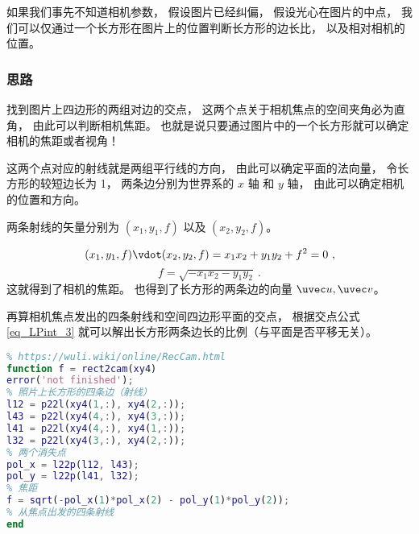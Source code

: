 
\begin{issues}
\issueDraft
\end{issues}


如果我们事先不知道相机参数， 假设图片已经纠偏， 假设光心在图片的中点， 我们可以仅通过一个长方形在图片上的位置判断长方形的边长比， 以及相对相机的位置。

\subsubsection{思路}

找到图片上四边形的两组对边的交点， 这两个点关于相机焦点的空间夹角必为直角， 由此可以判断相机焦距。 也就是说只要通过图片中的一个长方形就可以确定相机的焦距或者视角！

这两个点对应的射线就是两组平行线的方向， 由此可以确定平面的法向量， 令长方形的较短边长为 1， 两条边分别为世界系的 $x$ 轴 和 $y$ 轴， 由此可以确定相机的位置和方向。

两条射线的矢量分别为 $(x_1, y_1, f)$ 以及 $(x_2, y_2, f)$。

\begin{equation}
(x_1, y_1, f)\vdot (x_2, y_2, f) = x_1 x_2 + y_1 y_2 + f^2 = 0~,
\end{equation}
\begin{equation}
f = \sqrt{-x_1 x_2 - y_1 y_2}~.
\end{equation}
这就得到了相机的焦距。 也得到了长方形的两条边的向量 $\uvec u, \uvec v$。

再算相机焦点发出的四条射线和空间四边形平面的交点， 根据交点公式\autoref{eq_LPint_3}  就可以解出长方形两条边长的比例（与平面是否平移无关）。

\begin{lstlisting}[language=matlab,caption=rect2cam.m]
% 长方形相机定位法
% https://wuli.wiki/online/RecCam.html
function f = rect2cam(xy4)
error('not finished');
% 照片上长方形的四条边（射线）
l12 = p22l(xy4(1,:), xy4(2,:));
l43 = p22l(xy4(4,:), xy4(3,:));
l41 = p22l(xy4(4,:), xy4(1,:));
l32 = p22l(xy4(3,:), xy4(2,:));
% 两个消失点
pol_x = l22p(l12, l43);
pol_y = l22p(l41, l32);
% 焦距
f = sqrt(-pol_x(1)*pol_x(2) - pol_y(1)*pol_y(2));
% 从焦点出发的四条射线
end
\end{lstlisting}
